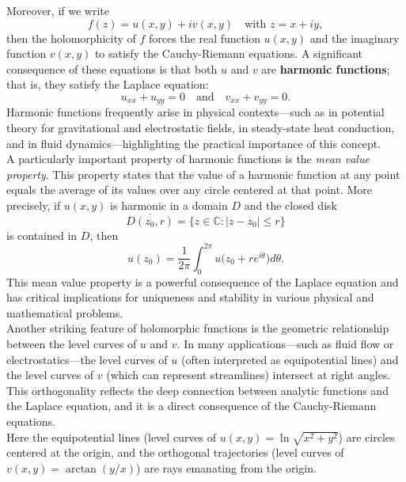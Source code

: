 \noindent Moreover, if we write
\[
f(z)=u(x,y)+iv(x,y) \quad \text{with } z=x+iy,
\]
then the holomorphicity of \(f\) forces the real function \(u(x,y)\) and the imaginary function \(v(x,y)\) to satisfy the Cauchy-Riemann equations. A significant consequence of these equations is that both \(u\) and \(v\) are \textbf{harmonic functions}; that is, they satisfy the Laplace equation:
\[
u_{xx}+u_{yy}=0 \quad \text{and} \quad v_{xx}+v_{yy}=0.
\]
\noindent Harmonic functions frequently arise in physical contexts—such as in potential theory for gravitational and electrostatic fields, in steady-state heat conduction, and in fluid dynamics—highlighting the practical importance of this concept. \\

\noindent A particularly important property of harmonic functions is the \emph{mean value property}. This property states that the value of a harmonic function at any point equals the average of its values over any circle centered at that point. More precisely, if \(u(x,y)\) is harmonic in a domain \(D\) and the closed disk
\[
\overline{D(z_0,r)}=\{z\in \mathbb{C} : |z-z_0|\le r\}
\]
is contained in \(D\), then
\[
u(z_0)=\frac{1}{2\pi}\int_0^{2\pi} u\bigl(z_0+re^{i\theta}\bigr)d\theta.
\]
This mean value property is a powerful consequence of the Laplace equation and has critical implications for uniqueness and stability in various physical and mathematical problems. \\

\noindent Another striking feature of holomorphic functions is the geometric relationship between the level curves of \(u\) and \(v\). In many applications—such as fluid flow or electrostatics—the level curves of \(u\) (often interpreted as equipotential lines) and the level curves of \(v\) (which can represent streamlines) intersect at right angles. This orthogonality reflects the deep connection between analytic functions and the Laplace equation, and it is a direct consequence of the Cauchy-Riemann equations.\\

\noindent Here the equipotential lines (level curves of \(u(x,y)=\ln\sqrt{x^2+y^2}\)) are circles centered at the origin, and the orthogonal trajectories (level curves of \(v(x,y)=\arctan(y/x)\)) are rays emanating from the origin.

\bigskip
\begin{center}
\end{center}

